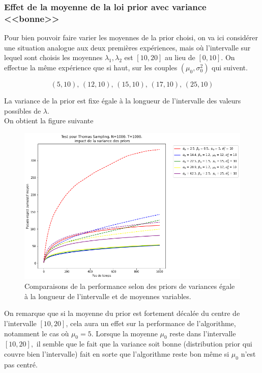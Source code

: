 \documentclass[letterpaper,11pt]{article}
\begin{document}
\subsubsection{Effet de la moyenne de la loi prior avec variance <<bonne>>}

Pour bien pouvoir faire varier les moyennes de la prior choisi, on va ici considérer une situation analogue aux deux premières expériences, mais où l'intervalle sur lequel sont choisis les moyennes $\lambda_1, \lambda_2$ est $[10,20]$ au lieu de $[0,10].$ On effectue la même expérience que si haut, sur les couples  $(\mu_0 ,\sigma^2_0)$ qui suivent.


$$(5,10),\,(12,10),\,(15,10),\,(17,10),\,(25,10)$$

La variance de la prior est fixe égale à la longueur de l'intervalle des valeurs possibles de $\lambda.$\\ 

On obtient la figure suivante

\begin{figure}[H]
\label{figure: moyenne décalée 1}
\caption{Comparaisons de la performance selon des priors de variances égale à la longueur de l'intervalle et de moyennes variables.}
\begin{center}
\includegraphics[scale=0.5]{etude_moyenne_decale_var10.png} 
\end{center}
\end{figure}

On remarque que si la moyenne du prior est fortement décalée du centre de l'intervalle $[10,20]$, cela aura un effet sur la performance de l'algorithme, notamment le cas où $\mu_0=5.$ Lorsque la moyenne $\mu_0$ reste dans l'intervalle $[10,20],$ il semble que le fait que la variance soit bonne (distribution prior qui couvre bien l'intervalle) fait en sorte que l'algorithme reste bon même si $\mu_0$ n'est pas centré.   
\end{document}
